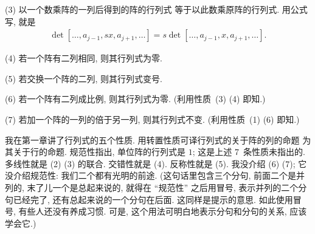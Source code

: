 \documentclass[%
    UTF8,%
    fontset=none,%
    punct=kaiming,%
    zihao=-4,%
    a4paper,%
    oneside,%
]{ctexbook}
\begin{document}
(3)
以一个数乘阵的一列后得到的阵的行列式%
等于以此数乘原阵的行列式.
用公式写, 就是
\begin{align*}
    \det {[\dots, a_{j-1}, sx, a_{j+1}, \dots]}
    = s \det {[\dots, a_{j-1}, x, a_{j+1}, \dots]}.
\end{align*}

(4)
若一个阵有二列相同, 则其行列式为零.

(5)
若交换一个阵的二列, 则其行列式变号.

(6)
若一个阵有二列成比例, 则其行列式为零.
(利用性质~(3) (4) 即知.)

(7)
若加一个阵的一列的倍于另一列, 则其行列式不变.
(利用性质~(1) (6) 即知.)

\vspace{2ex}

我在第一章讲了行列式的五个性质.
用转置性质可译行列式的关于阵的列的命题%
为其关于行的命题.
规范性指出, 单位阵的行列式是 \(1\);
这是上述 7~条性质未指出的.
多线性就是 (2) (3) 的联合.
交错性就是 (4).
反称性就是 (5).
我没介绍 (6) (7); 它没介绍规范性:
我们二个都有光明的前途.
(这句话里包含三个分句,
前面二个是并列的,
末了儿一个是总起来说的,
就得在 ``规范性'' 之后用冒号,
表示并列的二个分句已经完了,
还有总起来说的一个分句在后面.
这同样是提示的意思.
如此使用冒号, 有些人还没有养成习惯.
可是, 这个用法可明白地表示分句和分句的关系,
应该学会它.)
\end{document}
